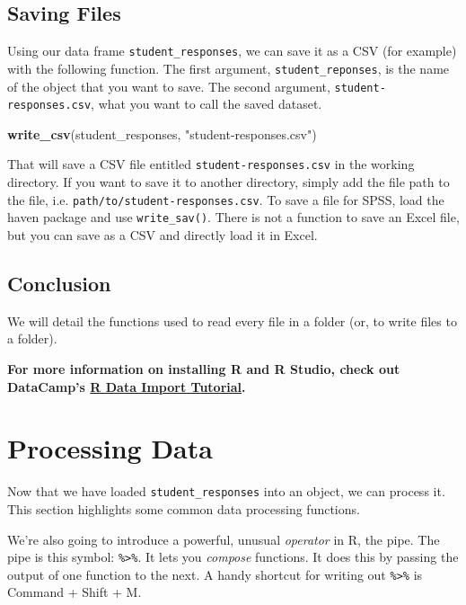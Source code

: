 \documentclass[]{book}
\newenvironment{Shaded}{\begin{snugshade}}{\end{snugshade}}
\newcommand{\KeywordTok}[1]{\textcolor[rgb]{0.13,0.29,0.53}{\textbf{#1}}}
\newcommand{\StringTok}[1]{\textcolor[rgb]{0.31,0.60,0.02}{#1}}
\newcommand{\NormalTok}[1]{#1}
\begin{document}
\subsection{Saving Files}\label{saving-files}

Using our data frame \texttt{student\_responses}, we can save it as a
CSV (for example) with the following function. The first argument,
\texttt{student\_reponses}, is the name of the object that you want to
save. The second argument, \texttt{student-responses.csv}, what you want
to call the saved dataset.

\begin{Shaded}
\begin{Highlighting}[]
\KeywordTok{write_csv}\NormalTok{(student_responses, }\StringTok{"student-responses.csv"}\NormalTok{)}
\end{Highlighting}
\end{Shaded}

That will save a CSV file entitled \texttt{student-responses.csv} in the
working directory. If you want to save it to another directory, simply
add the file path to the file, i.e.
\texttt{path/to/student-responses.csv}. To save a file for SPSS, load
the haven package and use \texttt{write\_sav()}. There is not a function
to save an Excel file, but you can save as a CSV and directly load it in
Excel.

\subsection{Conclusion}\label{conclusion}

We will detail the functions used to read every file in a folder (or, to
write files to a folder).

\textbf{For more information on installing R and R Studio, check out
DataCamp's
\href{https://www.datacamp.com/community/tutorials/installing-R-windows-mac-ubuntu}{R
Data Import Tutorial}.}

\section{Processing Data}\label{processing-data}

Now that we have loaded \texttt{student\_responses} into an object, we
can process it. This section highlights some common data processing
functions.

We're also going to introduce a powerful, unusual \emph{operator} in R,
the pipe. The pipe is this symbol: \texttt{\%\textgreater{}\%}. It lets
you \emph{compose} functions. It does this by passing the output of one
function to the next. A handy shortcut for writing out
\texttt{\%\textgreater{}\%} is Command + Shift + M.
\end{document}
